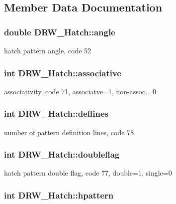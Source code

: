 \subsection{Member Data Documentation}
\hypertarget{classDRW__Hatch_aee22d8d574a33e852ad82c345899b886}{
\subsubsection[{angle}]{\setlength{\rightskip}{0pt plus 5cm}double D\-R\-W\-\_\-\-Hatch\-::angle}}\label{classDRW__Hatch_aee22d8d574a33e852ad82c345899b886}
hatch pattern angle, code 52 \hypertarget{classDRW__Hatch_af152cba96e8bd0471aafd2764defe458}{
\subsubsection[{associative}]{\setlength{\rightskip}{0pt plus 5cm}int D\-R\-W\-\_\-\-Hatch\-::associative}}\label{classDRW__Hatch_af152cba96e8bd0471aafd2764defe458}
associativity, code 71, associatve=1, non-\/assoc.=0 \hypertarget{classDRW__Hatch_a15bd241e3c34d82c35db31470fe25741}{
\subsubsection[{deflines}]{\setlength{\rightskip}{0pt plus 5cm}int D\-R\-W\-\_\-\-Hatch\-::deflines}}\label{classDRW__Hatch_a15bd241e3c34d82c35db31470fe25741}
number of pattern definition lines, code 78 \hypertarget{classDRW__Hatch_a06da8a64445bd9e5c159dab4243c992a}{
\subsubsection[{doubleflag}]{\setlength{\rightskip}{0pt plus 5cm}int D\-R\-W\-\_\-\-Hatch\-::doubleflag}}\label{classDRW__Hatch_a06da8a64445bd9e5c159dab4243c992a}
hatch pattern double flag, code 77, double=1, single=0 \hypertarget{classDRW__Hatch_abb23290d594b69e7b9c18ece2de7ec8e}{
\subsubsection[{hpattern}]{\setlength{\rightskip}{0pt plus 5cm}int D\-R\-W\-\_\-\-Hatch\-::hpattern}}\label{classDRW__Hatch_abb23290d594b69e7b9c18ece2de7ec8e}
